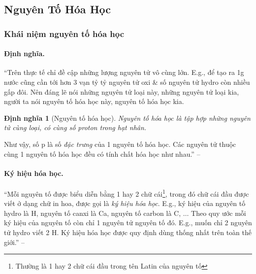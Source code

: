 \documentclass{article}
\numberwithin{equation}{section}
\newtheorem{dinhnghia}{Định nghĩa}[section]
\begin{document}

\subsection{Nguyên Tố Hóa Học}

\subsubsection{Khái niệm nguyên tố hóa học}

\paragraph{Định nghĩa.} ``Trên thực tế chỉ đề cập những lượng nguyên tử vô cùng lớn. E.g., để tạo ra 1g nước cũng cần tới hơn 3 vạn tỷ tỷ nguyên tử oxi \& số nguyên tử hydro còn nhiều gấp đôi. Nên đáng lẽ nói những nguyên tử loại này, những nguyên tử loại kia, người ta nói nguyên tố hóa học này, nguyên tố hóa học kia.

\begin{dinhnghia}[Nguyên tố hóa học]
	\emph{Nguyên tố hóa học} là tập hợp những nguyên tử cùng loại, có cùng số proton trong hạt nhân.
\end{dinhnghia}
Như vậy, số p là số \textit{đặc trưng} của 1 nguyên tố hóa học. Các nguyên tử thuộc cùng 1 nguyên tố hóa học đều có tính chất hóa học như nhau.'' -- \cite[p. 17]{SGK_Hoa_Hoc_8}

\paragraph{Ký hiệu hóa học.} ``Mỗi nguyên tố được biểu diễn bằng 1 hay 2 chữ cái\footnote{Thường là 1 hay 2 chữ cái đầu trong tên Latin của nguyên tố}, trong đó chữ cái đầu được viết ở dạng chữ in hoa, được gọi là \textit{ký hiệu hóa học}. E.g., ký hiệu của nguyên tố hydro là H, nguyên tố canxi là Ca, nguyên tố carbon là C, $\ldots$ Theo quy ước mỗi ký hiệu của nguyên tố còn chỉ 1 nguyên tử nguyên tố đó. E.g., muốn chỉ 2 nguyên tử hydro viết 2 H. Ký hiệu hóa học được quy định dùng thống nhất trên toàn thế giới.'' -- \cite[p. 17]{SGK_Hoa_Hoc_8}
\end{document}

